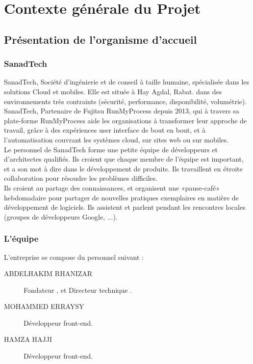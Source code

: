 
\chapter{Contexte générale du Projet} %

\label{Chapitre 1} %



\section{Présentation de l’organisme d’accueil}

\subsection{SanadTech}
SanadTech, Société d'ingénierie et de conseil à taille humaine, spécialisée dans les solutions Cloud et mobiles. Elle est située à Hay Agdal, Rabat. dans des environnements très contraints (sécurité, performance, disponibilité, volumétrie).\\[0.5cm]
SanadTech, Partenaire de Fujitsu RunMyProcess depuis 2013, qui à travers sa plate-forme RunMyProcess aide les organisations à transformer leur approche de travail, grâce à des expériences user interface de bout en bout, et à l'automatisation couvrant les systèmes cloud, sur sites web ou sur mobiles.\\[0.5cm]
Le personnel de SanadTech forme une petite équipe de développeurs et d'architectes qualifiés. Ils croient que chaque membre de l'équipe est important, et a son mot à dire dans le développement de produits. Ils travaillent en étroite collaboration pour résoudre les problèmes difficiles.\\[0.5cm]
Ils croient au partage des connaissances, et organisent une «pause-café» hebdomadaire pour partager de nouvelles pratiques exemplaires en matière de développement de logiciels. Ils assistent et parlent pendant les rencontres locales (groupes de développeurs Google, ...).
\subsection{L'équipe}
L'entreprise se compose du personnel suivant :
\begin{description}
 \item[ABDELHAKIM RHANIZAR] Fondateur , et Directeur technique .
 \item[MOHAMMED ERRAYSY] Développeur front-end.
 \item[HAMZA HAJJI] Développeur front-end.
 \end{description} 


